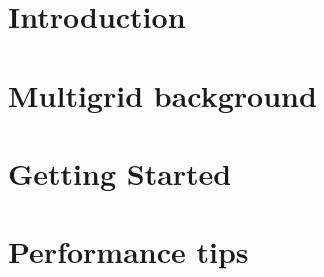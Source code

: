 \documentclass[pdf,12pt,report]{SANDreport}
\begin{document}


    \SANDmain		%

    \chapter{Introduction}\label{sec:introduction}
    

    \chapter{Multigrid background}\label{sec:multigrid}
    


    \chapter{Getting Started}\label{sec:getting started}
    

    \chapter{Performance tips}\label{sec:performance}
    

\end{document}
